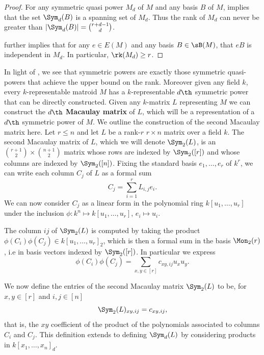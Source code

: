 \begin{proof}
For any symmetric quasi power $M_d$ of $M$ and any basis $B$ of $M$,  implies that the set $\Sym_d(B)$ is a spanning set of $M_d$. Thus the rank of $M_d$ can never be greater than $|\Sym_d(B)|=\binom{r+d-1}{d}$.

 further implies that for any $e\in E(M)$ and any basis $B\in \sB(M)$, that $eB$ is independent in $M_d$. In particular, $\rk(M_d)\geq r$.
\end{proof}
 In light of , we see that symmetric powers are exactly those symmetric quasi-powers that achieve the upper bound on the rank. Moreover given any field $k$, every $k$-representable matroid $M$ has a $k$-representable $d\th$ symmetric power that can be directly constructed. Given any $k$-matrix $L$ representing $M$ we can construct the $d\th$ \textbf{Macaulay matrix} of $L$, which will be a representation of a $d\th$ symmetric power of $M$. We outline the construction of the second Macaulay matrix here. Let $r\leq n$ and let $L$ be a rank-$r$ $r\times n$ matrix over a field $k$. The second Macaulay matrix of $L$, which we will denote $\Sym_2(L)$, is an $\binom{r+1}{2}\times \binom{n+1}{2}$ matrix whose rows are indexed by $\Sym_2([r])$ and whose columns are indexed by $\Sym_2([n])$. Fixing the standard basis $e_1,\dots,e_r$ of $k^r$, we can write each column $C_j$ of $L$ as a formal sum 
$$C_j = \sum_{i=1}^r L_{i,j}e_i.$$
We can now consider $C_j$ as a linear form in the polynomial ring $k[u_1,\dots,u_r]$ under the inclusion $\phi:k^n\mapsto k[u_1,\dots,u_r]$, $e_i\mapsto u_i$.

The column $ij$ of $\Sym_2(L)$ is computed by taking the product $\phi(C_i)\phi(C_j)\in k[u_1,\dots,u_r]_2$, which is then a formal sum in the basis $\Mon_2(r)$, i.e in basis vectors indexed by $\Sym_2([r])$. In particular we express 
$$\phi(C_i)\phi(C_j)=\sum_{x,y\in[r]} c_{xy,ij}u_xu_y.$$

We now define the entries of the second Macaulay matrix $\Sym_2(L)$ to be, for $x,y\in [r]$ and $i,j\in[n]$
$$\Sym_2(L)_{xy,ij} = c_{xy,ij},$$
that is, the $xy$ coefficient of the product of the polynomials associated to columns $C_i$ and $C_j$. This definition extends to defining $\Sym_{d}(L)$ by considering products in $k[x_1,\dots,x_n]_d.$

